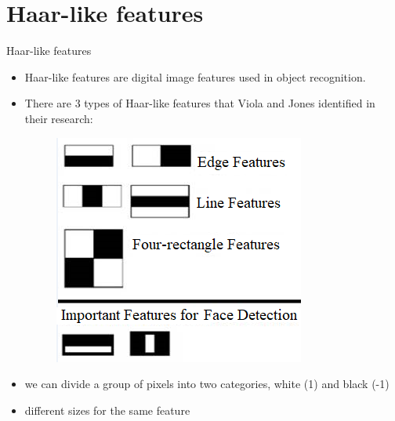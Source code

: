 \documentclass[aspectratio=169]{beamer}
\begin{document}
\section{Haar-like features}
\begin{frame}{Haar-like features}
    \begin{itemize}
        \item Haar-like features are digital image features used in object recognition.
        \item There are 3 types of Haar-like features that Viola and Jones identified in their research:
              \begin{figure}[h]
                  \centering
                  \includegraphics[width=0.3\linewidth]{assets/figures/haar-like-features.png}
              \end{figure}
        \item we can divide a group of pixels into two categories, white (1) and black (-1)
        \item different sizes for the same feature
    \end{itemize}
\end{frame}
\end{document}
